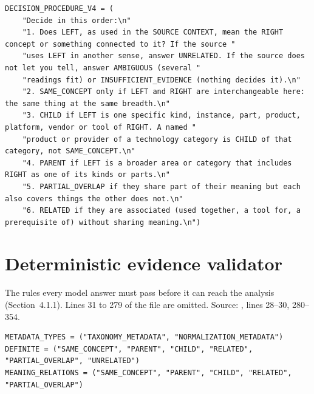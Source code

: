 \begin{lstlisting}[style=repo, firstnumber=203]
DECISION_PROCEDURE_V4 = (
    "Decide in this order:\n"
    "1. Does LEFT, as used in the SOURCE CONTEXT, mean the RIGHT concept or something connected to it? If the source "
    "uses LEFT in another sense, answer UNRELATED. If the source does not let you tell, answer AMBIGUOUS (several "
    "readings fit) or INSUFFICIENT_EVIDENCE (nothing decides it).\n"
    "2. SAME_CONCEPT only if LEFT and RIGHT are interchangeable here: the same thing at the same breadth.\n"
    "3. CHILD if LEFT is one specific kind, instance, part, product, platform, vendor or tool of RIGHT. A named "
    "product or provider of a technology category is CHILD of that category, not SAME_CONCEPT.\n"
    "4. PARENT if LEFT is a broader area or category that includes RIGHT as one of its kinds or parts.\n"
    "5. PARTIAL_OVERLAP if they share part of their meaning but each also covers things the other does not.\n"
    "6. RELATED if they are associated (used together, a tool for, a prerequisite of) without sharing meaning.\n")
\end{lstlisting}

\section{Deterministic evidence validator}
\label{app:A3}
The rules every model answer must pass before it can reach the analysis (Section~4.1.1). Lines 31 to 279 of the file are omitted. Source: , lines 28--30, 280--354.

\begin{lstlisting}[style=repo, firstnumber=28]
METADATA_TYPES = ("TAXONOMY_METADATA", "NORMALIZATION_METADATA")
DEFINITE = ("SAME_CONCEPT", "PARENT", "CHILD", "RELATED", "PARTIAL_OVERLAP", "UNRELATED")
MEANING_RELATIONS = ("SAME_CONCEPT", "PARENT", "CHILD", "RELATED", "PARTIAL_OVERLAP")
\end{lstlisting}


